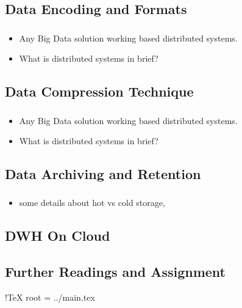 \subsection{Data Encoding and Formats}

\begin{frame}
    \frametitle{\subsecname}
    \begin{itemize}[<+->]
        \item Any Big Data solution working based distributed systems.
        \item What is distributed systems in brief?
    \end{itemize}
\end{frame}
\subsection{Data Compression Technique}

\begin{frame}
    \frametitle{\subsecname}
    \begin{itemize}[<+->]
        \item Any Big Data solution working based distributed systems.
        \item What is distributed systems in brief?
    \end{itemize}
\end{frame}

\subsection{Data Archiving and Retention}
\begin{frame}
    \frametitle{\subsecname}
    \begin{itemize}[<+->]
        \item some details about hot vs cold storage,
    \end{itemize}
\end{frame}


\subsection{DWH On Cloud}



\subsection{Further Readings and Assignment}


 !TeX root = ../main.tex
